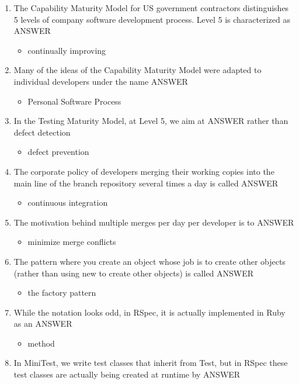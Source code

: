 \documentclass{exam}
\begin{document}
\begin{enumerate}
\begin{itemize}
\end{itemize}
\item The Capability Maturity Model for US government contractors distinguishes 5 levels of company software development process.  Level 5 is characterized as ANSWER
\begin{itemize}
\item continually improving
\end{itemize}
\item Many of the ideas of the Capability Maturity Model were adapted to individual developers under the name ANSWER
\begin{itemize}
\item Personal Software Process
\end{itemize}
\item In the Testing Maturity Model, at Level 5, we aim at ANSWER rather than defect detection
\begin{itemize}
\item defect prevention
\end{itemize}
\item The corporate policy of developers merging their working copies into the main line of the branch repository several times a day is called ANSWER
\begin{itemize}
\item continuous integration
\end{itemize}
\item The motivation behind multiple merges per day per developer is to ANSWER
\begin{itemize}
\item minimize merge conflicts
\end{itemize}
\item The pattern where you create an object whose job is to create other objects (rather than using new to create other objects) is called ANSWER
\begin{itemize}
\item the factory pattern
\end{itemize}
\item While the notation looks odd, in RSpec, it is actually implemented in Ruby as an ANSWER
\begin{itemize}
\item method
\end{itemize}
\item In MiniTest, we write test classes that inherit from Test, but in RSpec these test classes are actually being created at runtime by ANSWER

\end{enumerate}
\end{document}
